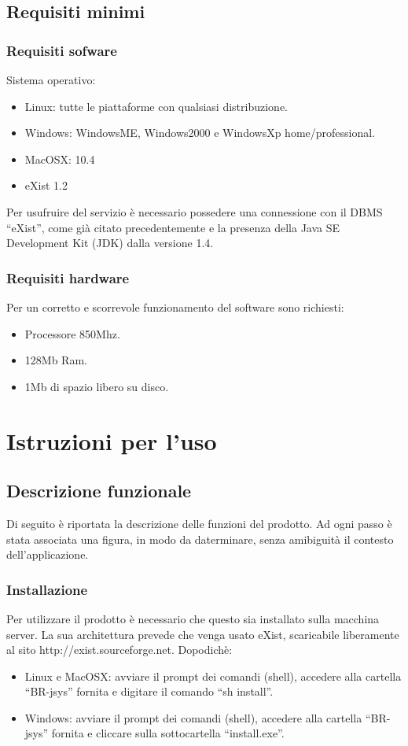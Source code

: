 \section{Requisiti minimi}
\subsection{Requisiti sofware}
Sistema operativo:
\begin{itemize}
\item Linux: tutte le piattaforme con qualsiasi distribuzione.
\item Windows: WindowsME, Windows2000 e WindowsXp home/professional.
\item MacOSX: 10.4
\item eXist 1.2
\end{itemize}
Per usufruire del servizio \`e necessario possedere una connessione con il DBMS ``eXist'', come gi\`a citato precedentemente e la presenza della Java SE Development Kit (JDK) dalla versione 1.4.
\subsection{Requisiti hardware}
Per un corretto e scorrevole funzionamento del software sono richiesti:
\begin{itemize}
\item Processore 850Mhz.
\item 128Mb Ram.
\item 1Mb di spazio libero su disco.
\end{itemize}

\chapter{Istruzioni per l'uso}
\section{Descrizione funzionale}
Di seguito \`e riportata la descrizione delle funzioni del prodotto. Ad ogni passo \`e stata associata una figura, in modo da daterminare, senza amibiguit\`a il contesto dell'applicazione.
\subsection{Installazione}
Per utilizzare il prodotto \`e necessario che questo sia installato sulla macchina server. La sua architettura prevede che venga usato eXist, scaricabile liberamente al sito http://exist.sourceforge.net. Dopodich\`e:
\begin{itemize}
\item Linux e MacOSX: avviare il prompt dei comandi (shell), accedere alla cartella ``BR-jsys'' fornita e digitare il comando ``sh install''.
\item Windows: avviare il prompt dei comandi (shell), accedere alla cartella ``BR-jsys'' fornita e cliccare sulla sottocartella ``install.exe''.
\end{itemize}
